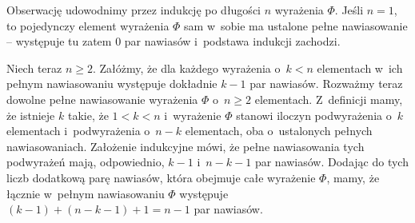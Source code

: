\exercise %
Obserwację udowodnimy przez indukcję po długości $n$ wyrażenia $\Phi$.
Jeśli $n=1$, to pojedynczy element wyrażenia $\Phi$ sam w~sobie ma ustalone pełne nawiasowanie -- występuje tu zatem 0 par nawiasów i~podstawa indukcji zachodzi.

Niech teraz $n\ge2$.
Załóżmy, że dla każdego wyrażenia o~$k<n$ elementach w~ich pełnym nawiasowaniu występuje dokładnie $k-1$ par nawiasów.
Rozważmy teraz dowolne pełne nawiasowanie wyrażenia $\Phi$ o~$n\ge2$ elementach.
Z~definicji mamy, że istnieje $k$ takie, że $1<k<n$ i~wyrażenie $\Phi$ stanowi iloczyn podwyrażenia o~$k$ elementach i~podwyrażenia o~$n-k$ elementach, oba o~ustalonych pełnych nawiasowaniach.
Założenie indukcyjne mówi, że pełne nawiasowania tych podwyrażeń mają, odpowiednio, $k-1$ i~$n-k-1$ par nawiasów.
Dodając do tych liczb dodatkową parę nawiasów, która obejmuje całe wyrażenie $\Phi$, mamy, że łącznie w~pełnym nawiasowaniu $\Phi$ występuje $(k-1)+(n-k-1)+1=n-1$ par nawiasów.
